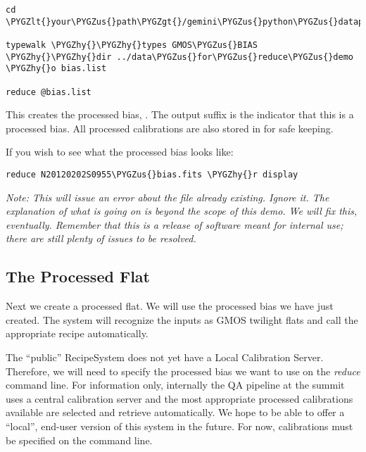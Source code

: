 \documentclass[letterpaper,10pt,english]{sphinxmanual}
\def\PYGZus{\char`\_}
\def\PYGZlt{\char`\<}
\def\PYGZgt{\char`\>}
\def\PYGZhy{\char`\-}
\begin{document}
\begin{Verbatim}[commandchars=\\\{\}]
cd \PYGZlt{}your\PYGZus{}path\PYGZgt{}/gemini\PYGZus{}python\PYGZus{}datapkg\PYGZhy{}X1/playground

typewalk \PYGZhy{}\PYGZhy{}types GMOS\PYGZus{}BIAS \PYGZhy{}\PYGZhy{}dir ../data\PYGZus{}for\PYGZus{}reduce\PYGZus{}demo \PYGZhy{}o bias.list

reduce @bias.list
\end{Verbatim}

This creates the processed bias, .  The output suffix
 is the indicator that this is a processed bias.  All processed calibrations
are also stored in  for safe keeping.

If you wish to see what the processed bias looks like:

\begin{Verbatim}[commandchars=\\\{\}]
reduce N20120202S0955\PYGZus{}bias.fits \PYGZhy{}r display
\end{Verbatim}

\emph{Note: This will issue an error about the file already existing.  Ignore it.
The explanation of what is going on is beyond the scope of this demo.  We
will fix this, eventually.  Remember that this is a release of software meant
for internal use; there are still plenty of issues to be resolved.}


\subsection{The Processed Flat}
\label{appendices/appendix_demo:the-processed-flat}
Next we create a processed flat.  We will use the processed bias we have
just created.  The system will recognize the inputs as GMOS twilight flats and
call the appropriate recipe automatically.

The ``public'' RecipeSystem does not yet have a Local Calibration Server.  Therefore,
we will need to specify the processed bias we want to use on the \emph{reduce} command
line.  For information only, internally the QA pipeline at the summit uses a
central calibration server and the most appropriate processed calibrations available
are selected and retrieve automatically.  We hope to be able to offer a ``local'',
end-user version of this system in the future.  For now, calibrations must be
specified on the command line.
\end{document}
